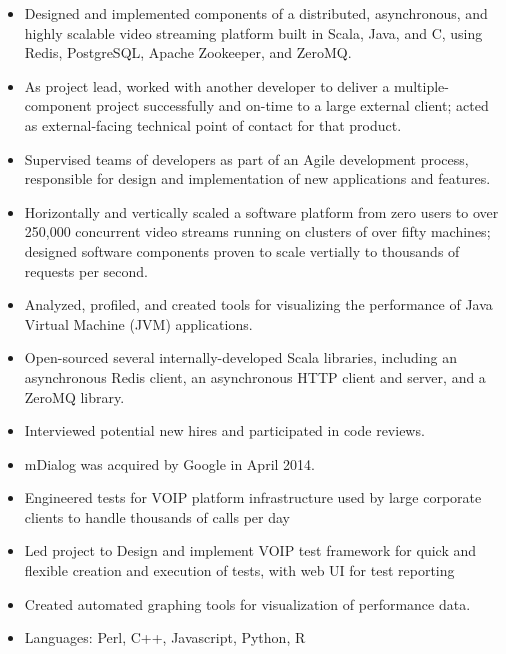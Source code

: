 \documentclass[11pt,a4paper,sans]{moderncv}
\begin{document}
{ \begin{itemize} \itemsep -1pt
  \item Designed and implemented components of a distributed, asynchronous, and highly scalable video streaming platform built in Scala, Java, and C, using Redis, PostgreSQL, Apache Zookeeper, and ZeroMQ.
  \item As project lead, worked with another developer to deliver a multiple-component project successfully and on-time to a large external client; acted as external-facing technical point of contact for that product.
  \item Supervised teams of developers as part of an Agile development process, responsible for design and implementation of new applications and features.
  \item Horizontally and vertically scaled a software platform from zero users to over 250,000 concurrent video streams running on clusters of over fifty machines; designed software components proven to scale vertially to thousands of requests per second.
  \item Analyzed, profiled, and created tools for visualizing the performance of Java Virtual Machine (JVM) applications.
  \item Open-sourced several internally-developed Scala libraries, including an asynchronous Redis client, an asynchronous HTTP client and server, and a ZeroMQ library.
  \item Interviewed potential new hires and participated in code reviews.
  \item mDialog was acquired by Google in April 2014.
\end{itemize} }

{ \begin{itemize} \itemsep -1pt
  \item Engineered tests for VOIP platform infrastructure used by large corporate clients to handle thousands of calls per day\item Led project to Design and implement VOIP test framework for quick and flexible creation and execution of tests, with web UI for test reporting\item Created automated graphing tools for visualization of performance data.\item Languages: Perl, C++, Javascript, Python, R
\end{itemize} }
\end{document}
